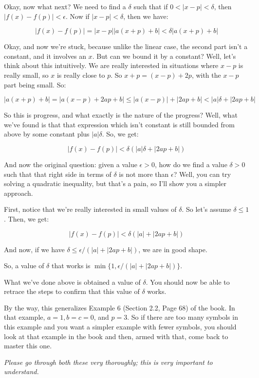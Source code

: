 \documentclass[10pt]{amsart}
\begin{document}
Okay, now what next? We need to find a $\delta$ such that if $0 < |x -
p| < \delta$, then $|f(x) - f(p)| < \epsilon$. Now if $|x - p| <
\delta$, then we have:

$$|f(x) - f(p)| = |x - p| |a(x + p) + b| < \delta|a(x + p) + b|$$

Okay, and now we're stuck, because unlike the linear case, the second
part isn't a constant, and it involves an $x$. But can we bound it by
a constant? Well, let's think about this intuitively. We are really
interested in situations where $x - p$ is really small, so $x$ is
really close to $p$. So $x + p = (x - p) + 2p$, with the $x - p$ part
being small. So:

$$|a(x + p) + b| = |a(x - p) + 2ap + b| \le |a(x - p)| + |2ap + b| < |a|\delta + |2ap + b|$$

So this is progress, and what exactly is the nature of the progress?
Well, what we've found is that that expression which isn't constant is
still bounded from above by some constant plus $|a|\delta$. So, we get:

$$|f(x) - f(p)| < \delta(|a|\delta + |2ap + b|)$$

And now the original question: given a value $\epsilon > 0$, how do we
find a value $\delta > 0$ such that that right side in terms of
$\delta$ is not more than $\epsilon$? Well, you can try solving a
quadratic inequality, but that's a pain, so I'll show you a simpler approach.

First, notice that we're really interested in small values of
$\delta$. So let's assume $\delta \le 1$. Then, we get:

$$|f(x) - f(p)| < \delta(|a| + |2ap + b|)$$

And now, if we have $\delta \le \epsilon/(|a| + |2ap + b|)$, we are in
good shape.

So, a value of $\delta$ that works is $\min \{ 1, \epsilon/(|a| + |2ap
+ b|) \}$.

What we've done above is obtained a value of $\delta$. You should now
be able to retrace the steps to confirm that this value of $\delta$
works.

By the way, this generalizes Example 6 (Section 2.2, Page 68) of the
book. In that example, $a = 1, b = c = 0$, and $p = 3$. So if there
are too many symbols in this example and you want a simpler example
with fewer symbols, you should look at that example in the book and
then, armed with that, come back to master this one.

{\em Please go through both these very thoroughly; this is very
important to understand.}
\end{document}
